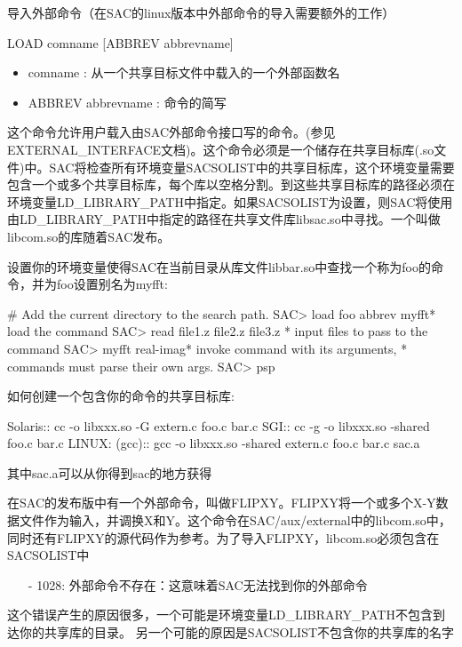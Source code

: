 \label{cmd:load}

导入外部命令（在SAC的linux版本中外部命令的导入需要额外的工作）

\begin{SACSTX}
LOAD comname [ABBREV abbrevname]
\end{SACSTX}

\begin{itemize}
\item comname : 从一个共享目标文件中载入的一个外部函数名 
\item ABBREV abbrevname : 命令的简写 
\end{itemize}

这个命令允许用户载入由SAC外部命令接口写的命令。(参见EXTERNAL\_INTERFACE文档)。这个命令必须是一个储存在共享目标库(.so文件)中。SAC将检查所有环境变量SACSOLIST中的共享目标库，这个环境变量需要包含一个或多个共享目标库，每个库以空格分割。到这些共享目标库的路径必须在环境变量LD\_LIBRARY\_PATH中指定。如果SACSOLIST为设置，则SAC将使用由LD\_LIBRARY\_PATH中指定的路径在共享文件库libsac.so中寻找。一个叫做libcom.so的库随着SAC发布。

设置你的环境变量使得SAC在当前目录从库文件libbar.so中查找一个称为foo的命令，并为foo设置别名为myfft:
\begin{SACCode}
#  Add the current directory to the search path.
SAC> load foo abbrev myfft* load the command
SAC> read file1.z file2.z file3.z  * input files to pass to the command
SAC> myfft real-imag* invoke command with its arguments,
* commands must parse their own args.
SAC> psp
\end{SACCode}

如何创建一个包含你的命令的共享目标库:
\begin{SACCode}
Solaris::
cc -o libxxx.so -G extern.c foo.c bar.c
SGI::
cc -g -o libxxx.so -shared foo.c bar.c
LINUX: (gcc)::
gcc -o libxxx.so -shared extern.c foo.c bar.c sac.a
\end{SACCode}
其中sac.a可以从你得到sac的地方获得

在SAC的发布版中有一个外部命令，叫做FLIPXY。FLIPXY将一个或多个X-Y数据文件作为输入，并调换X和Y。这个命令在SAC/aux/external中的libcom.so中，同时还有FLIPXY的源代码作为参考。为了导入FLIPXY，libcom.so必须包含在SACSOLIST中

\begin{itemize}
\item[-]1028: 外部命令不存在：这意味着SAC无法找到你的外部命令
\end{itemize}

这个错误产生的原因很多，一个可能是环境变量LD\_LIBRARY\_PATH不包含到达你的共享库的目录。
另一个可能的原因是SACSOLIST不包含你的共享库的名字
